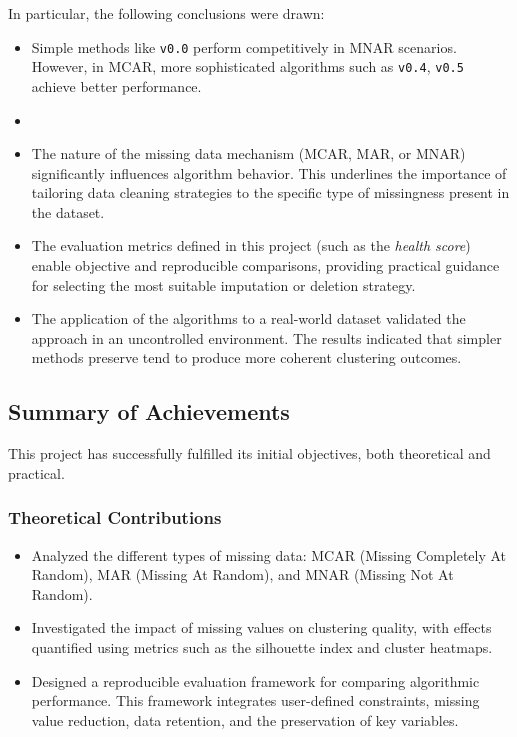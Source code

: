 \documentclass[a4paper,12pt]{article}
\begin{document}
In particular, the following conclusions were drawn:
\begin{itemize}
    \item Simple methods like \texttt{v0.0} perform competitively in MNAR scenarios. However, in MCAR, more sophisticated algorithms such as \texttt{v0.4}, \texttt{v0.5} achieve better performance.
    \item 
    \item The nature of the missing data mechanism (MCAR, MAR, or MNAR) significantly influences algorithm behavior. This underlines the importance of tailoring data cleaning strategies to the specific type of missingness present in the dataset.
    
    \item The evaluation metrics defined in this project (such as the \textit{health score}) enable objective and reproducible comparisons, providing practical guidance for selecting the most suitable imputation or deletion strategy.
    
    \item The application of the algorithms to a real-world dataset validated the approach in an uncontrolled environment. The results indicated that simpler methods preserve tend to produce more coherent clustering outcomes.
\end{itemize}

\subsection{Summary of Achievements}
This project has successfully fulfilled its initial objectives, both theoretical and practical.

\subsubsection{Theoretical Contributions}
\begin{itemize}
    \item Analyzed the different types of missing data: MCAR (Missing Completely At Random), MAR (Missing At Random), and MNAR (Missing Not At Random).
    
    \item Investigated the impact of missing values on clustering quality, with effects quantified using metrics such as the silhouette index and cluster heatmaps.
    
    \item Designed a reproducible evaluation framework for comparing algorithmic performance. This framework integrates user-defined constraints, missing value reduction, data retention, and the preservation of key variables.
\end{itemize}
\end{document}

